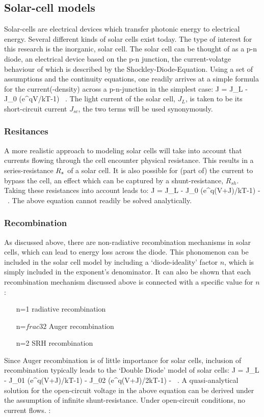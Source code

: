 \subsection{Solar-cell models}
Solar-cells are electrical devices which transfer photonic energy to electrical energy. Several different kinds of solar cells exist today. The type of interest for this research is the inorganic, \threefive \gaas solar cell.
The \gaas solar cell can be thought of as a p-n diode, an electrical device based on the p-n junction, the current-volatge behaviour of which is described by the Shockley-Diode-Equation. Using a set of assumptions and the continuity equations, one readily arrives at a simple formula for the current(-density) across a p-n-junction in the simplest case: %
\beq
	J = J_L - J_0 (e^{qV/kT}-1) \, .
\eeq
The light current of the solar cell, $J_L$, is taken to be its short-circuit current $J_{sc}$, the two terms will be used synonymously.
\subsubsection{Resitances}
A more realistic approach to modeling solar cells will take into account that currents flowing through the cell encounter physical resistance. This results in a series-resistance $R_s$ of a solar cell. It is also possible for (part of) the current to bypass the cell, an effect which can be captured by a shunt-resistance, $R_{sh}$. Taking these resistances into account leads to:
\beq
	J = J_L - J_0 (e^{q(V+J\rseries)/kT}-1) - \, .
\eeq
The above equation cannot readily be solved analytically.
\subsubsection{Recombination}
As discussed above, there are non-radiative recombination mechanisms in solar cells, which can lead to energy loss across the diode. This phonomenon can be included in the solar cell model by including a `diode-ideality' factor $n$, which is simply included in the exponent's denominator. It can also be shown that each recombination mechanism discussed above is connected with a specific value for $n$:
\begin{itemize}
\item[n=1] radiative recombination
\item[n=$frac{3}{2}$] Auger recombination
\item[n=2] SRH recombination
\end{itemize}
Since Auger recombination is of little importance for \gaas solar cells, inclusion of recombination typically leads to the `Double Diode' model of solar cells:
\beq
	J = J_L - J_{01} (e^{q(V+J\rseries)/kT}-1) - J_{02} (e^{q(V+J\rseries)/2kT}-1) - \, .
\eeq
A quasi-analytical solution for the open-circuit voltage in the above equation can be derived under the assumption of infinite shunt-resistance. Under open-circuit conditions, no current flows. :


